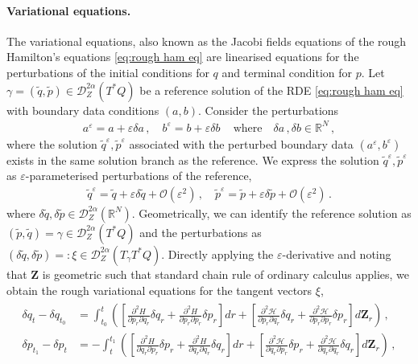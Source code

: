 \documentclass[11pt, oneside]{article}
\numberwithin{equation}{section}
\theoremstyle{definition}
\newcommand{\wt}[1]{\widetilde{#1}}
\newcommand{\mc}[1]{\mathcal{#1}}
\newcommand{\mcal}[1]{\mc{#1}}
\def\p{{\partial}}
\def\p{\partial}
\begin{document}
\paragraph{Variational equations.}
The variational equations, also known as the Jacobi fields equations of the rough Hamilton's equations \eqref{eq:rough ham eq} are linearised equations for the perturbations of the initial conditions for $q$ and terminal condition for $p$. Let $\gamma = (\wt{q}, \wt{p}) \in \mcal{D}^{2\alpha}_Z(T^*Q)$ be a reference solution of the RDE \eqref{eq:rough ham eq} with boundary data conditions $(a,b)$. Consider the perturbations 
\begin{align*}
    a^\varepsilon = a + \varepsilon \delta a\,,\quad  b^\varepsilon = b + \varepsilon \delta b\,\quad \text{where}\quad \delta a\,,\delta b \in \mathbb{R}^N\,,
\end{align*}
where the solution $\wt{q}^\varepsilon, \wt{p}^\varepsilon$ associated with the perturbed boundary data $(a^\varepsilon, b^\varepsilon)$ exists in the same solution branch as the reference. We express the solution $\wt{q}^\varepsilon, \wt{p}^\varepsilon$ as $\varepsilon$-parameterised perturbations of the reference,
\begin{align*}
    \wt{q}^\varepsilon = \wt{q} + \varepsilon \delta \wt{q} + \mcal{O}(\varepsilon^2)\,,\quad \wt{p}^\varepsilon = \wt{p} + \varepsilon \delta \wt{p} + \mcal{O}(\varepsilon^2)\,.
\end{align*}
where $\delta \wt{q}, \delta \wt{p} \in \mcal{D}^{2\alpha}_Z(\mathbb{R}^N)$.
Geometrically, we can identify the reference solution as $(\wt{p}, \wt{q})= \gamma \in \mcal{D}^{2\alpha}_Z(T^*Q)$ and the perturbations as $(\delta \wt{q}, \delta \wt{p}) =: \xi \in \mcal{D}^{2\alpha}_Z(T_{\gamma}T^*Q)$. Directly applying the $\varepsilon$-derivative and noting that $\mathbf{Z}$ is geometric such that standard chain rule of ordinary calculus applies, we obtain the rough variational equations for the tangent vectors $\xi$,
\begin{align}
    \begin{split}
        \delta q_t - \delta q_{t_0} &= \int_{t_0}^t \left(\left[\frac{\p^2 H}{\p p_r \p q_r} \delta q_r + \frac{\p^2 H}{\p p_r \p p_r} \delta p_r\right]dr + \left[\frac{\p^2 \mcal{H}}{\p p_r \p q_r} \delta q_r + \frac{\p^2 \mcal{H}}{\p p_r \p p_r} \delta p_r\right]d\mathbf{Z}_r\right)\,, \\
        \delta p_{t_1} - \delta p_t &= -\int_{t}^{t_1} \left(\left[\frac{\p^2 H}{\p q_r \p p_r} \delta p_r + \frac{\p^2 H}{\p q_r \p q_r} \delta q_r\right]dr + \left[\frac{\p^2 \mcal{H}}{\p q_r \p p_r} \delta p_r + \frac{\p^2 \mcal{H}}{\p q_r \p q_r} \delta q_r\right]d\mathbf{Z}_r \right)\,,
    \end{split} \label{eq:rough var eq}
\end{align}
\end{document}
